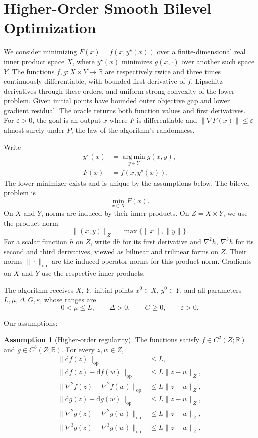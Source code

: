 \documentclass[10pt]{article}
\theoremstyle{definition}
\newtheorem{assumption}{Assumption}
\begin{document}
\section*{Higher-Order Smooth Bilevel Optimization}
We consider minimizing $F(x)=f(x,y^\star(x))$ over a finite-dimensional real inner product space $X$, where $y^\star(x)$ minimizes $g(x,\cdot)$ over another such space $Y$. The functions $f,g:X\times Y\to\mathbb{R}$ are respectively twice and three times continuously differentiable, with bounded first derivative of $f$, Lipschitz derivatives through these orders, and uniform strong convexity of the lower problem. Given initial points have bounded outer objective gap and lower gradient residual. The oracle returns both function values and first derivatives. For $\varepsilon>0$, the goal is an output $\bar{x}$ where $F$ is differentiable and $\|\nabla F(\bar{x})\|\leq\varepsilon$ almost surely under $P$, the law of the algorithm's randomness.

Write
\[
\begin{aligned}
y^\star(x)&=\operatorname*{arg\,min}_{y\in Y}g(x,y),\\
F(x)&=f(x,y^\star(x)).
\end{aligned}
\]
The lower minimizer exists and is unique by the assumptions below. The bilevel problem is
\[
\min_{x\in X} F(x).
\]
On $X$ and $Y$, norms are induced by their inner products. On $Z=X\times Y$, we use the product norm
\[
\|(x,y)\|_Z=\max\{\|x\|,\|y\|\}.
\]
For a scalar function $h$ on $Z$, write $\mathrm{d}h$ for its first derivative and $\nabla^2 h$, $\nabla^3 h$ for its second and third derivatives, viewed as bilinear and trilinear forms on $Z$. Their norms $\|\cdot\|_{\mathrm{op}}$ are the induced operator norms for this product norm. Gradients on $X$ and $Y$ use the respective inner products.

The algorithm receives $X$, $Y$, initial points $x^0\in X$, $y^0\in Y$, and all parameters $L,\mu,\Delta,G,\varepsilon$, whose ranges are
\[
0<\mu\leq L,\qquad \Delta>0,\qquad G\geq0,\qquad \varepsilon>0.
\]

Our assumptions:
\begin{assumption}[Higher-order regularity]
The functions satisfy $f\in C^2(Z;\mathbb{R})$ and $g\in C^3(Z;\mathbb{R})$. For every $z,w\in Z$,
\[
\begin{aligned}
\|\mathrm{d}f(z)\|_{\mathrm{op}}&\leq L,\\
\|\mathrm{d}f(z)-\mathrm{d}f(w)\|_{\mathrm{op}}&\leq L\|z-w\|_Z,\\
\|\nabla^2 f(z)-\nabla^2 f(w)\|_{\mathrm{op}}&\leq L\|z-w\|_Z,\\
\|\mathrm{d}g(z)-\mathrm{d}g(w)\|_{\mathrm{op}}&\leq L\|z-w\|_Z,\\
\|\nabla^2 g(z)-\nabla^2 g(w)\|_{\mathrm{op}}&\leq L\|z-w\|_Z,\\
\|\nabla^3 g(z)-\nabla^3 g(w)\|_{\mathrm{op}}&\leq L\|z-w\|_Z.
\end{aligned}
\]
\end{assumption}
\end{document}
